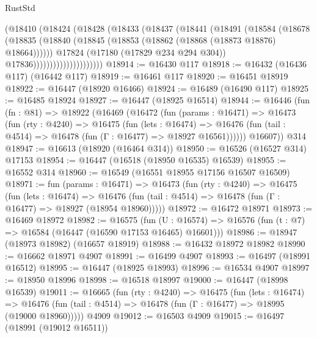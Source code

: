 \begin{lexlean}{RustStd}
\begin{coremodule}
                            (@18410
                              (@18424
                                (@18428
                                  (@18433
                                    (@18437
                                      (@18441
                                        (@18491
                                          (@18584
                                            (@18678
                                              (@18835
                                                (@18840
                                                  (@18845
                                                    (@18853
                                                      (@18862 (@18868 (@18873 @18876) @18664))))))
                                              @17824
                                              (@17180 (@17829 @234 @294 @304))
                                              @17836)))))))))))))))))))))
@18914 := @16430 @117
@18918 := @16432 (@16436 @117) (@16442 @117)
@18919 := @16461 @117
@18920 := @16451 @18919
@18922 := @16447 (@18920 @16466)
@18924 := @16489 (@16490 @117)
@18925 := @16485 @18924
@18927 := @16447 (@18925 @16514)
@18944 := @16446
    (fun (fn : @81) =>
    @18922
      (@16469
        (@16472
          (fun (params : @16471) =>
          @16473
            (fun (rty : @4240) =>
            @16475
              (fun (lets : @16474) =>
              @16476 (fun (tail : @4514) => @16478 (fun (Γ : @16477) => @18927 @16561))))))
        @16607))
    @314
@18947 := @16613 (@18920 (@16464 @314))
@18950 := @16526 (@16527 @314) @17153
@18954 := @16447 (@16518 (@18950 @16535) @16539)
@18955 := @16552 @314
@18960 := @16549 (@16551 @18955 @17156 @16507 @16509)
@18971 := fun (params : @16471) =>
  @16473
    (fun (rty : @4240) =>
    @16475
      (fun (lets : @16474) =>
      @16476 (fun (tail : @4514) => @16478 (fun (Γ : @16477) => @18927 (@18954 @18960)))))
@18972 := @16472 @18971
@18973 := @16469 @18972
@18982 := @16575
    (fun (U : @16574) => @16576 (fun (t : @7) => @16584 (@16447 (@16590 @17153 @16465) @16601)))
@18986 := @18947 (@18973 @18982) (@16657 @18919)
@18988 := @16432 @18972 @18982
@18990 := @16662 @18971 @4907
@18991 := @16499 @4907
@18993 := @16497 (@18991 @16512)
@18995 := @16447 (@18925 @18993)
@18996 := @16534 @4907
@18997 := @18950 @18996
@18998 := @16518 @18997
@19000 := @16447 (@18998 @16539)
@19011 := @16665
    (fun (rty : @4240) =>
    @16475
      (fun (lets : @16474) =>
      @16476 (fun (tail : @4514) => @16478 (fun (Γ : @16477) => @18995 (@19000 @18960)))))
    @4909
@19012 := @16503 @4909
@19015 := @16497 (@18991 (@19012 @16511))

\end{coremodule}
\end{lexlean}

